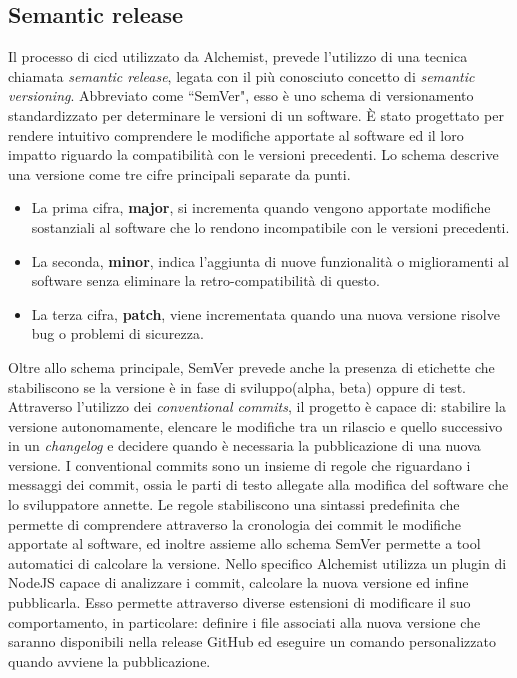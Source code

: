 \subsection{Semantic release}
Il processo di \ac{cicd} utilizzato da Alchemist, prevede l'utilizzo di una tecnica chiamata \textit{semantic release}, legata con il più conosciuto concetto di \textit{semantic versioning}. Abbreviato come ``SemVer", esso è uno schema di versionamento standardizzato per determinare le versioni di un software. È stato progettato per rendere intuitivo comprendere le modifiche apportate al software ed il loro impatto riguardo la compatibilità con le versioni precedenti. Lo schema descrive una versione come tre cifre principali separate da punti.
\begin{itemize}
	\item La prima cifra, \textbf{major}, si incrementa quando vengono apportate modifiche sostanziali al software che lo rendono incompatibile con le versioni precedenti.
	\item La seconda, \textbf{minor}, indica l'aggiunta di nuove funzionalità o miglioramenti al software senza eliminare la retro-compatibilità di questo.
	\item La terza cifra, \textbf{patch}, viene incrementata quando una nuova versione risolve bug o problemi di sicurezza.
\end{itemize}
Oltre allo schema principale, SemVer prevede anche la presenza di etichette che stabiliscono se la versione è in fase di sviluppo(alpha, beta) oppure di test.
Attraverso l'utilizzo dei \textit{conventional commits}, il progetto è capace di: stabilire la versione autonomamente, elencare le modifiche tra un rilascio e quello successivo in un \textit{changelog} e decidere quando è necessaria la pubblicazione di una nuova versione. I conventional commits sono un insieme di regole che riguardano i messaggi dei commit, ossia le parti di testo allegate alla modifica del software che lo sviluppatore annette. Le regole stabiliscono una sintassi predefinita che permette di comprendere attraverso la cronologia dei commit le modifiche apportate al software, ed inoltre assieme allo schema SemVer permette a tool automatici di calcolare la versione. Nello specifico Alchemist utilizza un plugin di NodeJS capace di analizzare i commit, calcolare la nuova versione ed infine pubblicarla. Esso permette attraverso diverse estensioni di modificare il suo comportamento, in particolare: definire i file associati alla nuova versione che saranno disponibili nella release GitHub ed eseguire un comando personalizzato quando avviene la pubblicazione.

